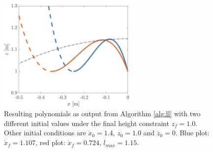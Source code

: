 \begin{figure}[h]
\centering
\includegraphics[width=0.6\textwidth]{STYLESTUFF/polynomialLengthViz.png}
\caption{Resulting polynomials as output from Algorithm \ref{alg:ll} with two different initial values under the final height constraint $z_f=1.0$. Other initial conditions are $\dot{x}_0=1.4$, $z_0=1.0$ and $\dot{z}_0=0$. Blue plot: $\dot{x}_f=1.107$, red plot: $\dot{x}_f=0.724$, $l_{max}=1.15$. }
\label{fig:pollength}
\end{figure}
